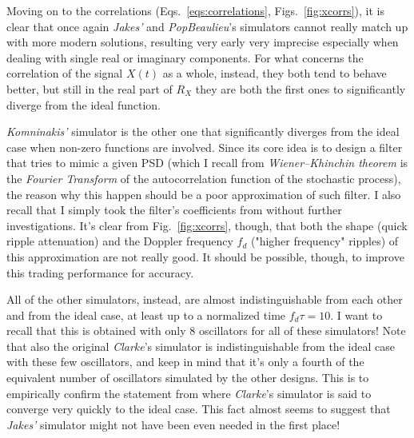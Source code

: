 Moving on to the correlations (Eqs.~\ref{eqs:correlations}, Figs.~\ref{fig:xcorrs}), it is clear that once again \textit{Jakes'} and \textit{PopBeaulieu}'s simulators cannot really match up with more modern solutions, resulting very early very imprecise especially when dealing with single real or imaginary components. For what concerns the correlation of the signal $X(t)$ as a whole, instead, they both tend to behave better, but still in the real part of $R_X$ they are both the first ones to significantly diverge from the ideal function.

\textit{Komninakis'} simulator is the other one that significantly diverges from the ideal case when non-zero functions are involved. Since its core idea is to design a filter that tries to mimic a given PSD (which I recall from \textit{Wiener–Khinchin theorem} is the \textit{Fourier Transform} of the autocorrelation function of the stochastic process), the reason why this happen should be a poor approximation of such filter. I also recall that I simply took the filter's coefficients from \cite{digital} without further investigations. It's clear from Fig.~\ref{fig:xcorrs}, though, that both the shape (quick ripple attenuation) and the Doppler frequency $f_d$ ("higher frequency" ripples) of this approximation are not really good. It should be possible, though, to improve this trading performance for accuracy.

All of the other simulators, instead, are almost indistinguishable from each other and from the ideal case, at least up to a normalized time $f_d\tau = 10$. I want to recall that this is obtained with only $8$ oscillators for all of these simulators! Note that also the original \textit{Clarke}'s simulator is indistinguishable from the ideal case with these few oscillators, and keep in mind that it's only a fourth of the equivalent number of oscillators simulated by the other designs. This is to empirically confirm the statement from \cite{B1} where \textit{Clarke}'s simulator is said to converge very quickly to the ideal case. This fact almost seems to suggest that \textit{Jakes'} simulator might not have been even needed in the first place!

